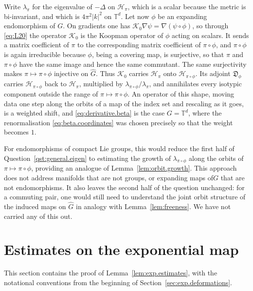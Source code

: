 \documentclass[11pt,reqno]{amsart}
\theoremstyle{plain}
\theoremstyle{definition}
\newcommand{\T}{\mathbb{T}}
\newcommand{\D}{\mathfrak{D}}
\newcommand{\Koop}{\mathcal{K}}
\begin{document}
Write \( \lambda_\pi \) for the eigenvalue of \( -\Delta \) on \( \mathcal H_\pi \), which is a scalar because the metric is bi-invariant, and which is \( 4\pi^2\lvert k\rvert^2 \) on \( \T^d \).
Let now \( \phi \) be an expanding endomorphism of \( G \).
On gradients one has \( \Koop_0\nabla\psi=\nabla(\psi\circ\phi) \), so through \eqref{eq:L20} the operator \( \Koop_0 \) is the Koopman operator of \( \phi \) acting on scalars.
It sends a matrix coefficient of \( \pi \) to the corresponding matrix coefficient of \( \pi\circ\phi \), and \( \pi\circ\phi \) is again irreducible because \( \phi \), being a covering map, is surjective, so that \( \pi \) and \( \pi\circ\phi \) have the same image and hence the same commutant. 
The same surjectivity makes \( \pi\mapsto\pi\circ\phi \) injective on \( \hat G \).
Thus \( \Koop_0 \) carries \( \mathcal H_\pi \) onto \( \mathcal H_{\pi\circ\phi} \). Its adjoint \( \D_\phi \) carries \( \mathcal H_{\pi\circ\phi} \) back to \( \mathcal H_\pi \), multiplied by \( \lambda_{\pi\circ\phi}/\lambda_\pi \), and annihilates every isotypic component outside the range of \( \pi\mapsto\pi\circ\phi \).
An operator of this shape, moving data one step along the orbits of a map of the index set and rescaling as it goes, is a weighted shift, and \eqref{eq:derivative.beta} is the case \( G=\T^d \), where the renormalisation \eqref{eq:beta.coordinates} was chosen precisely so that the weight becomes \( 1 \).

For endomorphisms of compact Lie groups, this would reduce the first half of Question~\ref{qst:general.eigen} to estimating the growth of \( \lambda_{\pi\circ\phi} \) along the orbits of \( \pi\mapsto\pi\circ\phi \), providing an analogue of Lemma~\ref{lem:orbit.growth}.
This approach does not address manifolds that are not groups, or expanding maps of\( G \) that are not endomorphisms.
It also leaves the second half of the question unchanged: for a commuting pair, one would still need to understand the joint orbit structure of the induced maps on \( \hat G \) in analogy with Lemma~\ref{lem:freeness}.
We have not carried any of this out.

\appendix
\section{Estimates on the exponential map}
    \label{sec:riemannian.estimates}
This section contains the proof of Lemma~\ref{lem:exp.estimates}, with the notational conventions from the beginning of Section~\ref{sec:exp.deformations}.
\end{document}
